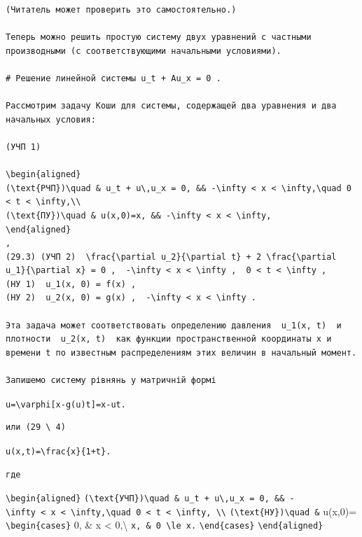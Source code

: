 \documentclass[
  ukrainian,
]{article}
\begin{document}
\begin{verbatim}
(Читатель может проверить это самостоятельно.)

Теперь можно решить простую систему двух уравнений с частными производными (с соответствующими начальными условиями).

# Решение линейной системы u_t + Au_x = 0 .

Рассмотрим задачу Коши для системы, содержащей два уравнения и два начальных условия:

(УЧП 1) 

\begin{aligned}
(\text{РЧП})\quad & u_t + u\,u_x = 0, && -\infty < x < \infty,\quad 0 < t < \infty,\\
(\text{ПУ})\quad & u(x,0)=x, && -\infty < x < \infty,
\end{aligned}
,  
(29.3) (УЧП 2)  \frac{\partial u_2}{\partial t} + 2 \frac{\partial u_1}{\partial x} = 0 ,  -\infty < x < \infty ,  0 < t < \infty ,  
(HУ 1)  u_1(x, 0) = f(x) ,  
(HУ 2)  u_2(x, 0) = g(x) ,  -\infty < x < \infty .

Эта задача может соответствовать определению давления  u_1(x, t)  и плотности  u_2(x, t)  как функции пространственной координаты x и времени t по известным распределениям этих величин в начальный момент.

Запишемо систему рівнянь у матричній формі
\end{verbatim}

\texttt{u=\textbackslash{}varphi{[}x-g(u)t{]}=x-ut.}

\begin{verbatim}
или (29 \ 4)
\end{verbatim}

\texttt{u(x,t)=\textbackslash{}frac\{x\}\{1+t\}.}

\begin{verbatim}
где
\end{verbatim}

\texttt{\textbackslash{}begin\{aligned\}}
\texttt{(\textbackslash{}text\{УЧП\})\textbackslash{}quad\ \&\ u\_t\ +\ u\textbackslash{},u\_x\ =\ 0,\ \&\&\ -\textbackslash{}infty\ \textless{}\ x\ \textless{}\ \textbackslash{}infty,\textbackslash{}quad\ 0\ \textless{}\ t\ \textless{}\ \textbackslash{}infty,\ \textbackslash{}\textbackslash{}}
\texttt{(\textbackslash{}text\{НУ\})\textbackslash{}quad\ \&} u(x,0)=
\texttt{\textbackslash{}begin\{cases\}} 0, \& x \textless{}
0,\textbackslash{} \texttt{x,\ \&\ 0\ \textbackslash{}le\ x.}
\texttt{\textbackslash{}end\{cases\}}
\texttt{\textbackslash{}end\{aligned\}}
\end{document}
